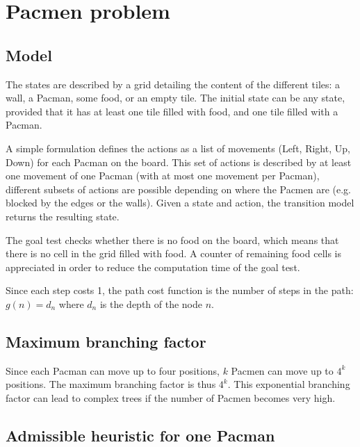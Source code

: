 \documentclass[journal]{IEEEtran}
\begin{document}
\section{Pacmen problem}

\subsection{Model}

The states are described by a grid detailing the content of the different tiles: a wall, a Pacman, some food, or an empty tile.
The initial state can be any state, provided that it has at least one tile filled with food, and one tile filled with a Pacman. 

A simple formulation defines the actions as a list of movements (Left, Right, Up, Down) for each Pacman on the board. 
This set of actions is described by at least one movement of one Pacman (with at most one movement per Pacman), different subsets of actions are possible depending on where the Pacmen are (e.g. blocked by the edges or the walls). 
Given a state and action, the transition model returns the resulting state.

The goal test checks whether there is no food on the board, which means that there is no cell in the grid filled with food. A counter of remaining food cells is appreciated in order to reduce the computation time of the goal test.

Since each step costs 1, the path cost function is the number of steps in the path: $g(n) = d_n$ where $d_n$ is the depth of the node $n$.


\subsection{Maximum branching factor}

Since each Pacman can move up to four positions, $k$ Pacmen can move up to $4^k$ positions. The maximum branching factor is thus $4^k$. This exponential branching factor can lead to complex trees if the number of Pacmen becomes very high.


\subsection{Admissible heuristic for one Pacman}
\end{document}
